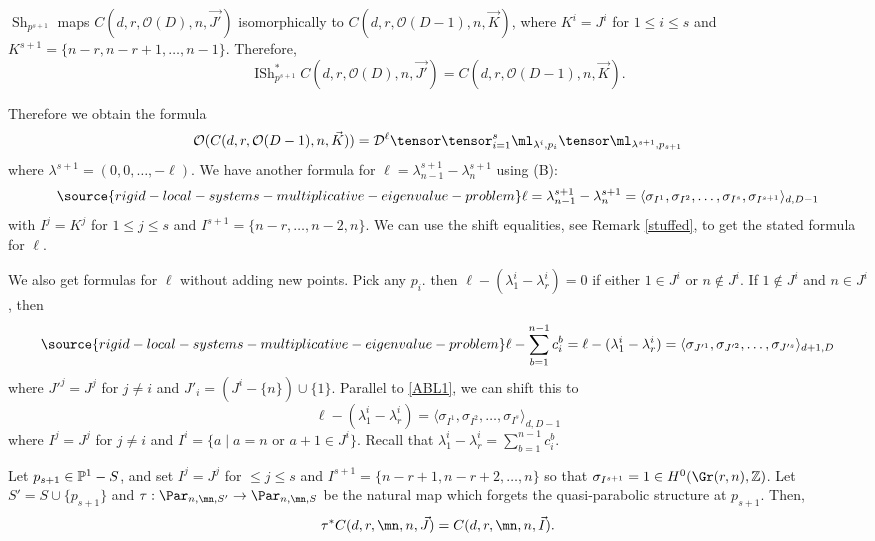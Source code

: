  $\operatorname{Sh}_{p^{s+1}}$ maps $C(d,r,\mathcal{O}(D),n,\vec{J'})$ isomorphically to $C(d,r,\mathcal{O}(D-1),n,\vec{K})$,
where $K^i=J^i$ for $1\leq i \leq s$ and $K^{s+1}=\{n-r,n-r+1,\dots,n-1\}$. Therefore,
$$\operatorname{ISh}_{p^{s+1}}^*C(d,r,\mathcal{O}(D),n,\vec{J'})=C(d,r,\mathcal{O}(D-1),n,\vec{K}).$$

Therefore we obtain the formula
$$\mathcal{O}(C(d,r,\mathcal{O}(D-1),n,\vec{K}))= \mathcal{D}^{\ell}\tensor\tensor_{i=1}^s\ml_{\lambda^i,p_i}\tensor\ml_{\lambda^{s+1},p_{s+1}}$$
where $\lambda^{s+1}=(0,0,\dots,-\ell)$. We have another formula for $\ell= \lambda_{n-1}^{s+1}-\lambda_{n}^{s+1}$ using  (B):
\begin{equation}\label{ABL1}
\source{rigid-local-systems-multiplicative-eigenvalue-problem}
\ell= \lambda_{n-1}^{s+1}-\lambda_{n}^{s+1}=\langle\sigma_{I^1}, \sigma_{I^2},\dots,\sigma_{I^s},\sigma_{I^{s+1}}\rangle_{d,D-1}
\end{equation}
with $I^j=K^j$ for $1\leq j\leq s$ and $I^{s+1}=\{n-r,\dots,n-2,n\}$. We can use the shift equalities, see Remark \ref{stuffed},  to get the stated formula for $\ell$.

\begin{remark}
\notready\label{earlyAM}
We also get formulas for $\ell$ without adding new points.  Pick any $p_i$. then $\ell-(\lambda^i_{1}-\lambda^i_{r})=0$ if either $1\in J^i$ or $n\not\in J^i$. If $1\not\in J^i$ and $n\in J^i$, then
\begin{equation}\label{ABL4}
\source{rigid-local-systems-multiplicative-eigenvalue-problem}
\ell-\sum_{b=1}^{n-1}c^b_i=\ell-(\lambda^i_{1}-\lambda^i_{r})=\langle\sigma_{J'^1}, \sigma_{J'^2},\dots,\sigma_{J'^s}\rangle_{d+1,D}
\end{equation}
where $J'^j=J^j$ for $j\neq i$ and $J'_i= (J^{i}-\{n\})\cup \{1\}$. Parallel to \eqref{ABL1}, we can shift this to
$$\ell-(\lambda^i_{1}-\lambda^i_{r})=\langle\sigma_{I^1}, \sigma_{I^2},\dots,\sigma_{I^s}\rangle_{d,D-1}$$
where $I^j=J^j$ for $j\neq i$ and $I^i= \{a\mid a=n\text{ or } a+1\in J^i\}$. Recall that $\lambda^i_1-\lambda^i_r=\sum_{b=1}^{n-1} c^b_i$.
\end{remark}

\begin{lemma}
\notready\label{propagation}
 Let $p_{s+1}\in \Bbb{P}^1-S$, and set $I^j=J^j$ for $\leq j\leq s$ and  $I^{s+1}=\{n-r+1,n-r+2,\dots,n\}$ so that $\sigma_{I^{s+1}}=1\in H^0(\Gr(r,n),\Bbb{Z})$. Let $S'=S\cup\{p_{s+1}\}$ and $\tau: \Par_{n,\mn,S'}\to \Par_{n,\mn,S}$ be the natural map which forgets the quasi-parabolic structure at $p_{s+1}$. Then,
 $$\tau^*C(d,r,\mn,n,\vec{J})=C(d,r,\mn,n,\vec{I}).$$
 \end{lemma}
